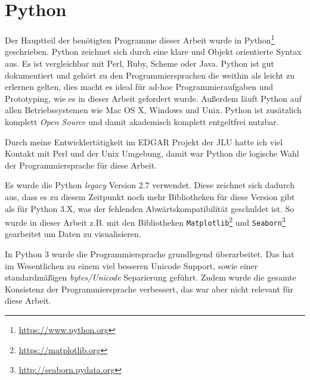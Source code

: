 


\section{Python}
Der Hauptteil der benötigten Programme dieser Arbeit wurde in Python\footnote{\url{https://www.python.org}} geschrieben. Python zeichnet sich durch eine klare und Objekt orientierte Syntax aus. Es ist vergleichbar mit Perl, Ruby, Scheme oder Java. Python ist gut dokumentiert und gehört zu den Programmiersprachen die weithin als leicht zu erlernen gelten, dies macht es ideal für ad-hoc Programmieraufgaben und Prototyping, wie es in dieser Arbeit gefordert wurde. Außerdem läuft Python auf allen Betriebssystemen wie Mac OS X, Windows und Unix. Python ist zusätzlich komplett \emph{Open Source} und damit akademisch komplett entgeltfrei nutzbar.

Durch meine Entwicklertätigkeit im EDGAR \cite{Yu.2017} Projekt der JLU hatte ich viel Kontakt mit Perl und der Unix Umgebung, damit war Python die logische Wahl der Programmiersprache für diese Arbeit.

Es wurde die Python \emph{legacy} Version 2.7 verwendet. Diese zeichnet sich dadurch aus, dass es zu diesem Zeitpunkt noch mehr Bibliotheken für diese Version gibt als für Python 3.X, was der fehlenden Abwärtskompatibilität geschuldet ist. So wurde in dieser Arbeit z.B. mit den Bibliotheken \texttt{Matplotlib}\footnote{\url{https://matplotlib.org}} und \texttt{Seaborn}\footnote{\url{http://seaborn.pydata.org}} gearbeitet um Daten zu visualisieren.

In Python 3 wurde die Programmiersprache grundlegend überarbeitet. Das hat im Wesentlichen zu einem viel besseren Unicode Support, sowie einer standardmäßigen \emph{bytes/Unicode} Separierung geführt. Zudem wurde die gesamte Konsistenz der Programmiersprache verbessert, das war aber nicht relevant für diese Arbeit.
